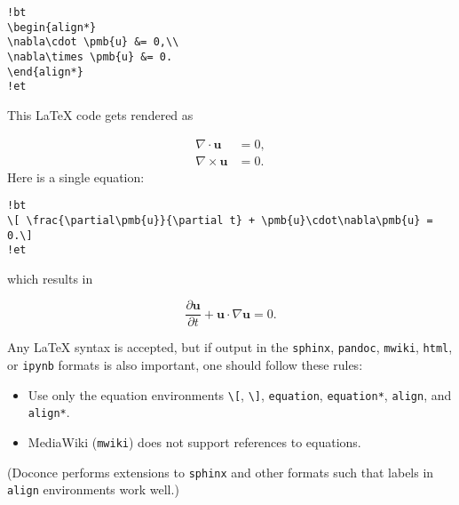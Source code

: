 \documentclass[%
oneside,                 %
final,                   %
10pt]{article}
\begin{document}
\begin{Verbatim}[numbers=none,fontsize=\fontsize{9pt}{9pt},baselinestretch=0.85,xleftmargin=0mm]
!bt
\begin{align*}
\nabla\cdot \pmb{u} &= 0,\\ 
\nabla\times \pmb{u} &= 0.
\end{align*}
!et
\end{Verbatim}

This {\LaTeX} code gets rendered as

\begin{align*}
\nabla\cdot \pmb{u} &= 0,\\ 
\nabla\times \pmb{u} &= 0.
\end{align*}
Here is a single equation:

\begin{Verbatim}[numbers=none,fontsize=\fontsize{9pt}{9pt},baselinestretch=0.85,xleftmargin=0mm]
!bt
\[ \frac{\partial\pmb{u}}{\partial t} + \pmb{u}\cdot\nabla\pmb{u} = 0.\]
!et
\end{Verbatim}
which results in

\[ \frac{\partial\pmb{u}}{\partial t} + \pmb{u}\cdot\nabla\pmb{u} = 0.\]

Any {\LaTeX} syntax is accepted, but if output in the \Verb!sphinx!, \Verb!pandoc!,
\Verb!mwiki!, \Verb!html!, or \Verb!ipynb! formats
is also important, one should follow these rules:

\begin{itemize}
  \item Use only the equation environments \Verb!\[!, \Verb!\]!,
    \Verb!equation!, \Verb!equation*!, \Verb!align!, and \Verb!align*!.

  \item MediaWiki (\Verb!mwiki!) does not support references to equations.
\end{itemize}

\noindent
(Doconce performs extensions to \Verb!sphinx! and other formats such that
labels in \Verb!align! environments work well.)



\setlength{\fboxrule}{2pt}
\begin{center}
\end{center}
\setlength{\fboxrule}{0.4pt} %
\end{document}
